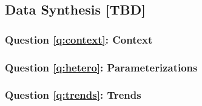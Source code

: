 \documentclass{article}
\begin{document}
\subsection{Data Synthesis [TBD]}
\subsubsection{Question \ref{q:context}: Context}
\subsubsection{Question \ref{q:hetero}: Parameterizations}
\subsubsection{Question \ref{q:trends}: Trends}
\clearpage
\printbibliography
\clearpage
\appendix
%
%
\end{document}
